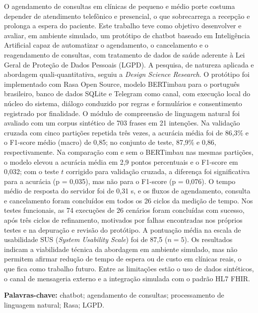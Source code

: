 \documentclass[12pt,a4paper]{extarticle}
\begin{document}
\noindent O agendamento de consultas em clínicas de pequeno e médio porte costuma depender de atendimento telefônico e presencial, o que sobrecarrega a recepção e prolonga a espera do paciente. Este trabalho teve como objetivo desenvolver e avaliar, em ambiente simulado, um protótipo de chatbot baseado em Inteligência Artificial capaz de automatizar o agendamento, o cancelamento e o reagendamento de consultas, com tratamento de dados de saúde aderente à Lei Geral de Proteção de Dados Pessoais (LGPD). A pesquisa, de natureza aplicada e abordagem quali-quantitativa, seguiu a \textit{Design Science Research}. O protótipo foi implementado com Rasa Open Source, modelo BERTimbau para o português brasileiro, banco de dados SQLite e Telegram como canal, com execução local do núcleo do sistema, diálogo conduzido por regras e formulários e consentimento registrado por finalidade. O módulo de compreensão de linguagem natural foi avaliado com um corpus sintético de 703 frases em 21 intenções. Na validação cruzada com cinco partições repetida três vezes, a acurácia média foi de 86,3\% e o F1-score médio (macro) de 0,85; no conjunto de teste, 87,9\% e 0,86, respectivamente. Na comparação com e sem o BERTimbau nas mesmas partições, o modelo elevou a acurácia média em 2,9 pontos percentuais e o F1-score em 0,032; com o teste $t$ corrigido para validação cruzada, a diferença foi significativa para a acurácia (p = 0,035), mas não para o F1-score (p = 0,076). O tempo médio de resposta do servidor foi de 0,31 s, e os fluxos de agendamento, consulta e cancelamento foram concluídos em todos os 26 ciclos da medição de tempo. Nos testes funcionais, as 74 execuções de 26 cenários foram concluídas com sucesso, após três ciclos de refinamento, motivados por falhas encontradas nos próprios testes e na depuração e revisão do protótipo. A pontuação média na escala de usabilidade SUS (\textit{System Usability Scale}) foi de 87,5 ($n = 5$). Os resultados indicam a viabilidade técnica da abordagem em ambiente simulado, mas não permitem afirmar redução de tempo de espera ou de custo em clínicas reais, o que fica como trabalho futuro. Entre as limitações estão o uso de dados sintéticos, o canal de mensageria externo e a integração simulada com o padrão HL7 FHIR.

\vspace{0.5cm}
\noindent \textbf{Palavras-chave:} chatbot; agendamento de consultas; processamento de linguagem natural; Rasa; LGPD.
\end{document}
